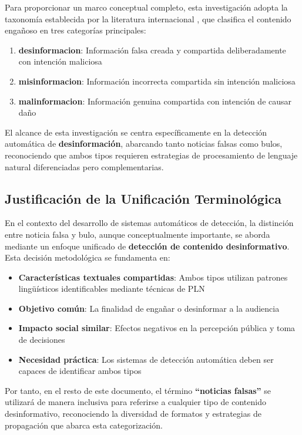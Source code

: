 Para proporcionar un marco conceptual completo, esta investigación adopta la taxonomía establecida por la literatura internacional \cite{bondielli2019survey, hu2022deep}, que clasifica el contenido engañoso en tres categorías principales:

\begin{enumerate}
    \item \textbf{\gls{desinformacion}}: Información falsa creada y compartida deliberadamente con intención maliciosa
    \item \textbf{\gls{misinformacion}}: Información incorrecta compartida sin intención maliciosa
    \item \textbf{\gls{malinformacion}}: Información genuina compartida con intención de causar daño
\end{enumerate}

El alcance de esta investigación se centra específicamente en la detección automática de \textbf{desinformación}, abarcando tanto noticias falsas como bulos, reconociendo que ambos tipos requieren estrategias de procesamiento de lenguaje natural diferenciadas pero complementarias.

\subsection{Justificación de la Unificación Terminológica}

En el contexto del desarrollo de sistemas automáticos de detección, la distinción entre noticia falsa y bulo, aunque conceptualmente importante, se aborda mediante un enfoque unificado de \textbf{detección de contenido desinformativo}. Esta decisión metodológica se fundamenta en:

\begin{itemize}
    \item \textbf{Características textuales compartidas}: Ambos tipos utilizan patrones lingüísticos identificables mediante técnicas de PLN
    \item \textbf{Objetivo común}: La finalidad de engañar o desinformar a la audiencia
    \item \textbf{Impacto social similar}: Efectos negativos en la percepción pública y toma de decisiones
    \item \textbf{Necesidad práctica}: Los sistemas de detección automática deben ser capaces de identificar ambos tipos
\end{itemize}

Por tanto, en el resto de este documento, el término \textbf{``noticias falsas''} se utilizará de manera inclusiva para referirse a cualquier tipo de contenido desinformativo, reconociendo la diversidad de formatos y estrategias de propagación que abarca esta categorización.

